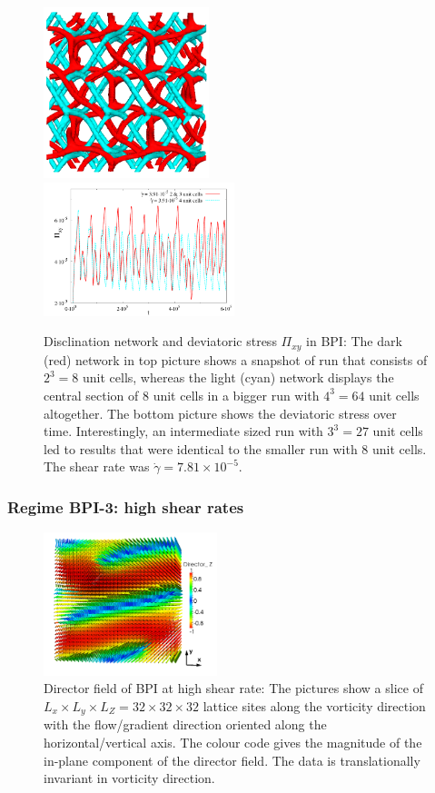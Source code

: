 \documentclass[aps,pre,reprint,superscriptaddress, twocolumn]{revtex4}
\newcommand{\e}[1]{\times10^{#1}}
\newcommand{\gd}{\dot{\gamma}}
\begin{document}
\begin{figure}[htpb]
\includegraphics[width=0.43\textwidth]{disc+y-600k-run911_run1163.png}\\
\includegraphics[width=0.495\textwidth]{stress_bp1_2uc_4uc.pdf}
\caption{Disclination network and deviatoric stress $\Pi_{xy}$ in BPI: 
The dark (red) network in top picture shows a snapshot of run that consists 
of $2^3=8$ unit cells, whereas the light (cyan) network displays the 
central section of 8 unit cells in a bigger run with $4^3=64$ unit cells altogether. 
The bottom picture shows the deviatoric stress over time. Interestingly, 
an intermediate sized run with $3^3=27$ unit cells led to results that 
were identical to the smaller run with 8 unit cells. The shear rate was $\gd=7.81\e{-5}$.
}
\label{bp1-2uc4uc}
\end{figure}

\subsubsection{Regime BPI-3: high shear rates}

\begin{figure}[htpb]
\includegraphics[width=0.45\textwidth]{dir3d-z-302k_run916.png}
\caption{Director field of BPI at high shear rate: The pictures show a slice 
of $L_x\times L_y \times L_Z= 32\times32\times 32$ lattice sites along the vorticity direction 
with the flow/gradient direction oriented along the horizontal/vertical axis. 
The colour code gives the magnitude of the in-plane component of the director field. 
The data is translationally invariant in vorticity direction.}
\label{bp1-high}
\end{figure}
 
\end{document}
